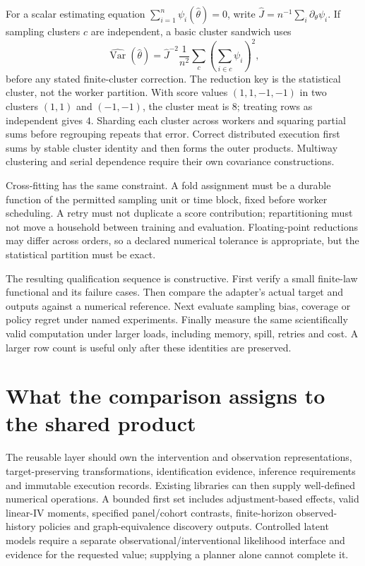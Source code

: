For a scalar estimating equation $\sum_{i=1}^n\psi_i(\widehat\theta)=0$,
write $\widehat J=n^{-1}\sum_i\partial_\theta\psi_i$.
If sampling clusters $c$ are independent, a basic cluster sandwich uses
\begin{equation}
 \widehat{\operatorname{Var}}(\widehat\theta)=
 \widehat J^{-2}\frac1{n^2}\sum_c
       \left(\sum_{i\in c}\psi_i\right)^2,
 \label{r3:software-cluster-reduction}
\end{equation}
before any stated finite-cluster correction. The reduction key is the
statistical cluster, not the worker partition. With score values
$(1,1,-1,-1)$ in two clusters $(1,1)$ and $(-1,-1)$, the cluster meat is
$8$; treating rows as independent gives $4$. Sharding each cluster across
workers and squaring partial sums before regrouping repeats that error.
Correct distributed execution first sums by stable cluster identity and
then forms the outer products. Multiway clustering and serial dependence
require their own covariance constructions.

Cross-fitting has the same constraint. A fold assignment must be a durable
function of the permitted sampling unit or time block, fixed before
worker scheduling. A retry must not duplicate a score contribution;
repartitioning must not move a household between training and evaluation.
Floating-point reductions may differ across orders, so a declared numerical
tolerance is appropriate, but the statistical partition must be exact.

The resulting qualification sequence is constructive. First verify a
small finite-law functional and its failure cases. Then compare the
adapter's actual target and outputs against a numerical reference.
Next evaluate sampling bias, coverage or policy regret under named
experiments. Finally measure the same scientifically valid computation
under larger loads, including memory, spill, retries and cost. A larger
row count is useful only after these identities are preserved.

\section{What the comparison assigns to the shared product}
\label{r3:software-composition}

The reusable layer should own the intervention and observation
representations, target-preserving transformations, identification evidence,
inference requirements and immutable execution records. Existing libraries
can then supply well-defined numerical operations. A bounded first set
includes adjustment-based effects, valid linear-IV moments, specified
panel/cohort contrasts, finite-horizon observed-history policies and
graph-equivalence discovery outputs. Controlled latent models require a
separate observational/interventional likelihood interface and evidence
for the requested value; supplying a planner alone cannot complete it.

